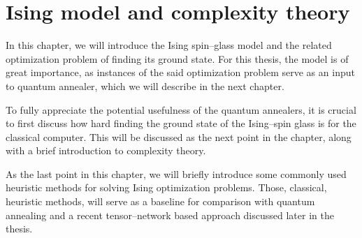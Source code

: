 \chapter{Ising model and complexity theory}


In this chapter, we will introduce the Ising spin--glass model and the related optimization problem
of finding its ground state. For this thesis, the model is of great importance, as instances of the said optimization problem serve as an input to quantum annealer, which we will describe in the next chapter.

To fully appreciate the potential usefulness of the quantum annealers, it is crucial to first discuss how hard finding the ground state of the Ising--spin glass is for the classical computer.
This will be discussed as the next point in the chapter, along with a brief introduction to complexity theory.

As the last point in this chapter, we will briefly introduce some commonly used heuristic methods for solving Ising optimization problems. Those, classical, heuristic methods, will serve as a baseline for comparison with quantum annealing and a recent tensor--network based approach discussed
later in the thesis.

